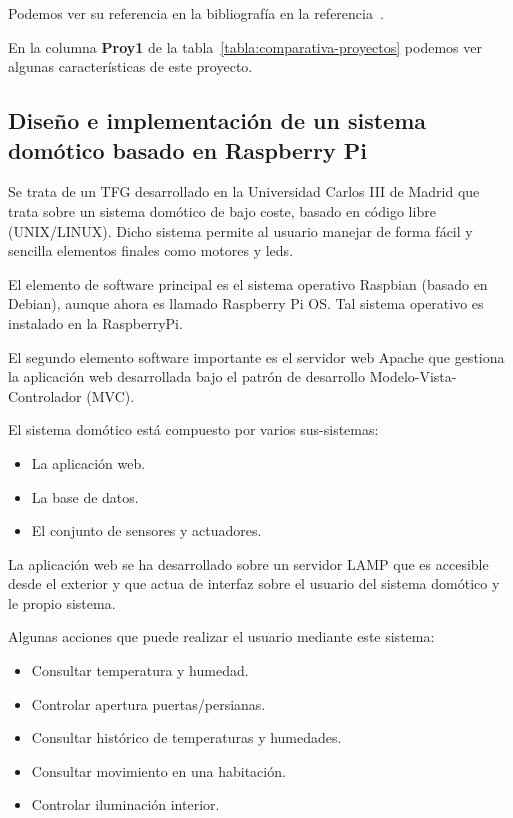 Podemos ver su referencia en la bibliografía en la referencia~\cite{TesisBaron2017}.

En la columna \textbf{Proy1} de la tabla~\ref{tabla:comparativa-proyectos} podemos ver algunas características de este proyecto.

\subsection{Diseño e implementación de un sistema domótico basado en Raspberry Pi}\label{Proy2}

Se trata de un TFG desarrollado en la Universidad Carlos III de Madrid que trata sobre un sistema domótico de bajo coste, basado en código libre (UNIX/LINUX). Dicho sistema permite al usuario manejar de forma fácil y sencilla elementos finales como motores y leds.

El elemento de software principal es el sistema operativo Raspbian (basado en Debian), aunque ahora es llamado Raspberry Pi OS. Tal sistema operativo es instalado en la RaspberryPi.

El segundo elemento software importante es el servidor web Apache que gestiona la aplicación web desarrollada bajo el patrón de desarrollo Modelo-Vista-Controlador (MVC).

El sistema domótico está compuesto por varios sus-sistemas:

\begin{itemize}
	\item La aplicación web.
	\item La base de datos.
	\item El conjunto de sensores y actuadores.
\end{itemize}

La aplicación web se ha desarrollado sobre un servidor LAMP que es accesible desde el exterior y que actua de interfaz sobre el usuario del sistema domótico y le propio sistema.

Algunas acciones que puede realizar el usuario mediante este sistema:

\begin{itemize}
	\item Consultar temperatura y humedad.
	\item Controlar apertura puertas/persianas.
	\item Consultar histórico de temperaturas y humedades.
	\item Consultar movimiento en una habitación.
	\item Controlar iluminación interior.
\end{itemize}

